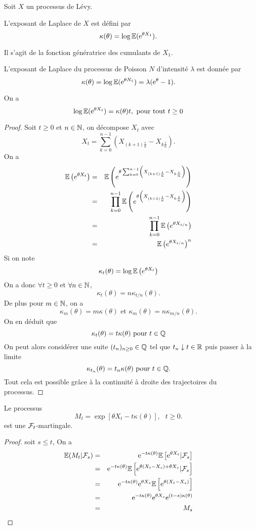 Soit $X$ un processus de Lévy.
\begin{definition}
L'exposant de Laplace de $X$ est défini par 
$$
\kappa(\theta) = \log \mathbb{E}(\mathrm{e}^{\theta X_1}).
$$
\end{definition}
Il s'agit de la fonction génératrice des cumulants de $X_1$.
\begin{ex}
L'exposant de Laplace du processus de Poisson $N$ d'intensité $\lambda$ est donnée par 
$$
\kappa(\theta) = \log\mathbb{E}(\mathrm{e}^{\theta N_1}) = \lambda(\mathrm{e}^\theta - 1). 
$$
\end{ex}
\begin{prop}
On a 
$$
\log \mathbb{E}(\mathrm{e}^{\theta X_t}) = \kappa(\theta)t,\text{ pour tout }t\geq 0
$$
\end{prop}
\begin{proof}
Soit $t\geq 0$ et $n\in \mathbb{N}$, on décompose $X_t$ avec 
$$
X_t=\sum_{k=0}^{n-1}\left(X_{(k+1)\frac{t}{n}} - X_{k\frac{t}{n}} \right).
$$
On a 
\begin{eqnarray*}
\mathbb{E}\left(e^{\theta X_t}\right)&=&\mathbb{E}\left(e^{\theta \sum_{k=0}^{n-1}\left(X_{(k+1)\frac{t}{n}} - X_{k\frac{t}{n}} \right)}\right)\\
&=&\prod_{k=0}^{n-1}\mathbb{E}\left(e^{\theta \left(X_{(k+1)\frac{t}{n}} - X_{k\frac{t}{n}} \right)}\right)\\
&=&\prod_{k=0}^{n-1}\mathbb{E}\left(e^{\theta X_{t/n}}\right)\\
&=&\mathbb{E}\left(e^{\theta X_{t/n}}\right)^n\\
\end{eqnarray*}
Si on note 
$$
\kappa_t(\theta) = \log \mathbb{E}\left(e^{\theta X_t}\right)
$$
On a donc $\forall t\geq 0$ et $\forall n\in \mathbb{N}$,
$$
\kappa_t(\theta) = n\kappa_{t/n}(\theta).
$$
De plus pour $m\in\mathbb{N}$, on a 
$$
\kappa_m(\theta) = m\kappa(\theta)\text{ et }\kappa_m(\theta) = n\kappa_{m/n}(\theta).
$$
On en déduit que 
$$
\kappa_t(\theta) = t\kappa(\theta)\text{ pour }t\in\mathbb{Q}
$$
On peut alors considérer une suite $(t_n)_{n\geq 0}\in \mathbb{Q}$ tel que $t_n\downarrow t\in \mathbb{R}$ puis passer à la limite 
$$
\kappa_{t_n}(\theta) = t_n\kappa(\theta)\text{ pour }t\in\mathbb{Q}.
$$
Tout cela est possible grâce à la continuité à droite des trajectoires du processus.
\end{proof}
\begin{prop}\label{prop:Wald_martingale_Levy}
Le processus 
$$
M_t = \exp\left[\theta X_t - t\kappa(\theta)\right],\text{ }t\geq 0.
$$
est une $\mathcal{F}_t$-martingale.
\end{prop}
\begin{proof}
soit $s\leq t$, On a 
\begin{eqnarray*}
\mathbb{E}(M_t|\mathcal{F}_s)&=&\mathrm{e}^{-t\kappa(\theta)}\mathbb{E}\left[\mathrm{e}^{\theta X_t}|\mathcal{F}_s\right]\\
&=&\mathrm{e}^{-t\kappa(\theta)}\mathbb{E}\left[\mathrm{e}^{\theta (X_t-X_s) +\theta X_s}|\mathcal{F}_s\right]\\
&=&\mathrm{e}^{-t\kappa(\theta)}\mathrm{e}^{\theta X_s}\mathbb{E}\left[\mathrm{e}^{\theta (X_t-X_s)}\right]\\
&=&\mathrm{e}^{-t\kappa(\theta)}\mathrm{e}^{\theta X_s}\mathrm{e}^{(t-s)\kappa(\theta)}\\
&=&M_s\\
\end{eqnarray*}
\end{proof}

